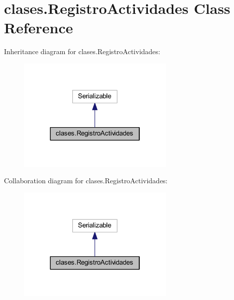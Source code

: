 \hypertarget{classclases_1_1_registro_actividades}{}\section{clases.\+Registro\+Actividades Class Reference}
\label{classclases_1_1_registro_actividades}


Inheritance diagram for clases.\+Registro\+Actividades\+:
\nopagebreak
\begin{figure}[H]
\begin{center}
\leavevmode
\includegraphics[width=214pt]{classclases_1_1_registro_actividades__inherit__graph}
\end{center}
\end{figure}


Collaboration diagram for clases.\+Registro\+Actividades\+:
\nopagebreak
\begin{figure}[H]
\begin{center}
\leavevmode
\includegraphics[width=214pt]{classclases_1_1_registro_actividades__coll__graph}
\end{center}
\end{figure}
